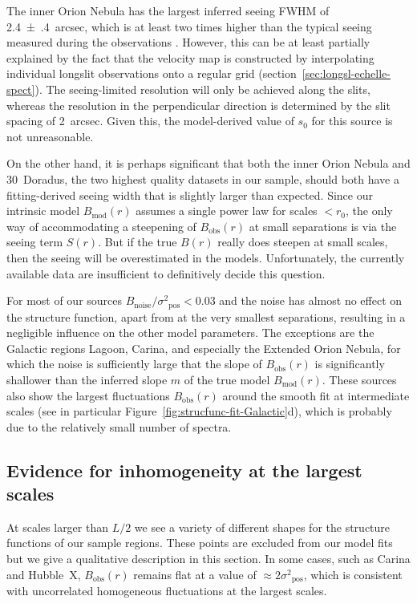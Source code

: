 \documentclass[fleqn,usenatbib, useAMS, a4paper]{mnras}
\newcommand\pos{\ensuremath{_{\mathrm{pos}}}}
\newcommand\noise{\ensuremath{_{\text{noise}}}}
\newcommand\obs{\ensuremath{_{\mathrm{obs}}}}
\newcommand\model{\ensuremath{_{\mathrm{mod}}}}
\begin{document}
The inner Orion Nebula has the largest inferred seeing FWHM of \SI{2.4(4)}{arcsec},
which is at least two times higher than the typical seeing measured during the observations
\citep{Doi:2004a}.
However, this can be at least partially explained by the fact that the velocity map is constructed
by interpolating individual longslit observations onto a regular grid
(section~\ref{sec:longsl-echelle-spect}).
The seeing-limited resolution will only be achieved along the slits,
whereas the resolution in the perpendicular direction is determined by the slit spacing of \SI{2}{arcsec}.
Given this, the model-derived value of \(s_0\) for this source is not unreasonable.

On the other hand, it is perhaps significant that both
the inner Orion Nebula and 30~Doradus,
the two highest quality datasets in our sample,
should both have a fitting-derived seeing width that is
slightly larger than expected.
Since our intrinsic model \(B\model(r)\) assumes a single power law
for scales \(<r_0\),
the only way of accommodating a steepening of \(B\obs(r)\) at small separations
is via the seeing term \(S(r)\).
But if the true \(B(r)\) really does steepen at small scales,
then the seeing will be overestimated in the models.
Unfortunately, the currently available data are insufficient to
definitively decide this question.

For most of our sources \(B\noise / \sigma^2\pos < 0.03 \) and the noise
has almost no effect on the structure function,
apart from at the very smallest separations,
resulting in a negligible influence on the other model parameters.
The exceptions are the Galactic regions Lagoon, Carina,
and especially the Extended Orion Nebula,
for which the noise is sufficiently large that the slope
of \(B\obs(r)\) is significantly shallower than
the inferred slope \(m\) of the true model \(B\model(r)\).
These sources also show the largest fluctuations
\(B\obs(r)\) around the smooth fit
at intermediate scales
(see in particular Figure~\ref{fig:strucfunc-fit-Galactic}d),
which is probably due to the relatively small number of spectra.


\subsection{Evidence for inhomogeneity at the largest scales}
\label{sec:evid-inhom-at}

At scales larger than \(L/2\)
we see a variety of different shapes for the structure functions
of our sample regions.
These points are excluded from our model fits but we give
a qualitative description in this section.
In some cases,
such as Carina and Hubble~X,
\(B\obs(r)\) remains flat at a value of \(\approx 2\sigma^2\pos\),
which is consistent with uncorrelated homogeneous fluctuations
at the largest scales.
\end{document}
